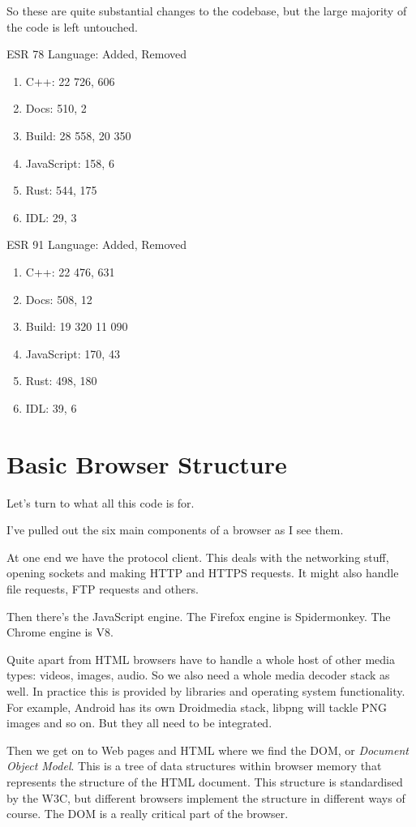\documentclass{article}
\begin{document}
So these are quite substantial changes to the codebase, but the large majority of the code is left untouched.

ESR 78
Language: Added, Removed
\begin{enumerate}
\item C++: 22 726, 606
\item Docs: 510, 2
\item Build: 28 558, 20 350
\item JavaScript: 158, 6
\item Rust: 544, 175
\item IDL: 29, 3
\end{enumerate}

ESR 91
Language: Added, Removed
\begin{enumerate}
\item C++: 22 476, 631
\item Docs: 508, 12
\item Build: 19 320 11 090
\item JavaScript: 170, 43
\item Rust: 498, 180
\item IDL: 39, 6
\end{enumerate}


\section{Basic Browser Structure}

Let's turn to what all this code is for.

I've pulled out the six main components of a browser as I see them.

At one end we have the protocol client. This deals with the networking stuff, opening sockets and making HTTP and HTTPS requests. It might also handle file requests, FTP requests and others.

Then there's the JavaScript engine. The Firefox engine is Spidermonkey. The Chrome engine is V8.

Quite apart from HTML browsers have to handle a whole host of other media types: videos, images, audio. So we also need a whole media decoder stack as well. In practice this is provided by libraries and operating system functionality. For example, Android has its own Droidmedia stack, libpng will tackle PNG images and so on. But they all need to be integrated.

Then we get on to Web pages and HTML where we find the DOM, or {\it Document Object Model}. This is a tree of data structures within browser memory that represents the structure of the HTML document. This structure is standardised by the W3C, but different browsers implement the structure in different ways of course. The DOM is a really critical part of the browser.
\end{document}
